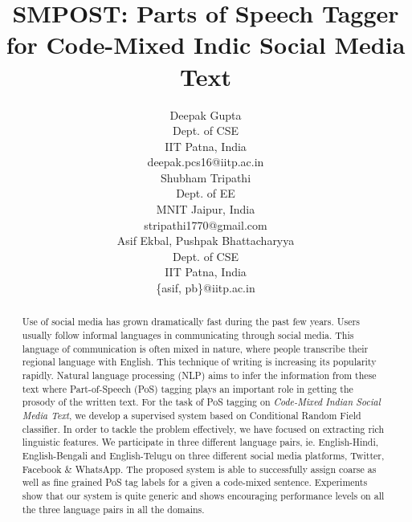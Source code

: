 \documentclass[11pt,a4paper]{article}
\title{SMPOST: Parts of Speech Tagger for Code-Mixed Indic Social Media Text}
\author{Deepak Gupta \\
  Dept. of CSE\\
  IIT Patna, India \\
  {deepak.pcs16@iitp.ac.in} \\\And
  Shubham Tripathi \\
  Dept. of EE \\
  MNIT Jaipur, India \\
  {stripathi1770@gmail.com} \\\And
   Asif Ekbal, Pushpak Bhattacharyya \\
  Dept. of CSE\\
  IIT Patna, India \\
  {\{asif, pb\}@iitp.ac.in} \\}
\date{}
\begin{document}
\maketitle
\begin{abstract}
Use of social media has grown dramatically fast during the past few years. Users usually follow informal languages in communicating through social media. This language of communication is often mixed in nature, where people transcribe their regional language with English. This technique of writing is increasing its popularity rapidly. %
Natural language processing (NLP) aims to infer the information from these text where Part-of-Speech (PoS) tagging plays an important role in getting the prosody of the written text. For the task of PoS tagging on \textit{Code-Mixed Indian Social Media Text}, we develop a supervised system based on Conditional Random Field classifier. In order to tackle the problem effectively, we have focused on extracting rich linguistic features. %
We participate in three different language pairs, ie. English-Hindi, English-Bengali and English-Telugu on three different social media platforms, Twitter, Facebook \& WhatsApp. The proposed system is able to successfully assign coarse as well as fine grained PoS tag labels for a given a code-mixed sentence. %
Experiments show that our system is quite generic and shows encouraging performance levels on all the three language pairs in all the domains.%
\end{abstract}
\end{document}
